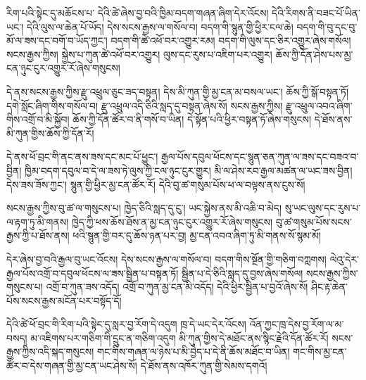 \documentclass[12pt]{nextbook}
\begin{document}
\begin{readersection}{རིག་པའི་སྟེང་དུ་མཆོངས་པ་}
དེའི་ཚེ་ཞེས་བྱ་བའི་ཁྱིམ་བདག་གཞན་ཞིག་དེར་འོངས། དེའི་རིགས་ནི་བཟང་པོ་ཡིན་ཡང་། དེའི་ལུས་ལ་ཆེན་པོ་ཡོད། དེས་སངས་རྒྱས་ལ་གསོལ་བ། བདག་གི་སྙུན་གྱི་ཕྱིར་ངལ་ཆེ། བདག་གི་བུ་དང་བུ་མོ་ལ་ཟས་དང་བགོ་བ་ཡོད་ཀྱང་། བདག་གི་ཚེ་འཕོ་བར་འགྱུར་རམ། བདག་གི་ལུས་དང་ཅིར་འགྱུར་ཞེས་གསོལ། སངས་རྒྱས་ཀྱིས། སྐྱེས་པ་ཀུན་ཚེ་འཕོ་བར་འགྱུར། ལུས་དང་རུས་པ་འཇིག་པར་འགྱུར། ཆོས་ཀྱི་དོན་ཤེས་པས་མྱ་ངན་ཉུང་ངུར་འགྱུར་རོ་ཞེས་གསུངས།

དེ་ནས་སངས་རྒྱས་ཀྱིས་རྫུ་འཕྲུལ་ཅུང་ཟད་བསྟན། དེས་མི་ཀུན་གྱི་མྱ་ངན་མ་བསལ་ཡང་། ཆོས་ཀྱི་སྒོ་བསྟན་ཏོ། དགེ་སློང་ཞིག་གིས་གསོལ་བ། རྫུ་འཕྲུལ་འདི་ཅིའི་སླད་དུ་བསྟན་ཞེས་སོ། སངས་རྒྱས་ཀྱིས། རྫུ་འཕྲུལ་འབའ་ཞིག་གིས་འགྲོ་བ་མི་སྐྱོབ། ཆོས་ཀྱི་དོན་ཚོར་བ་ནི་གསོ་བ་ཡིན། དེ་སྟོན་པའི་ཕྱིར་བསྟན་ཏོ་ཞེས་གསུངས། དེ་ཐོས་ནས་མི་ཀུན་གྱིས་ཆོས་ཀྱི་དོན་རོ།

དེ་ནས་ཕོ་བྲང་གི་ནང་ནས་ཟས་དང་མང་པོ་ཕྱུང་། རྒྱལ་པོས་དབུལ་ཕོངས་དང་སྙུན་ཅན་ཀུན་ལ་ཟས་དང་བཟའ་བ་བྱིན། ཁྱིམ་བདག་དབུལ་བ་དེ་ལ་ཟས་ཏེ་ལུས་ཀྱི་ངལ་ཉུང་ངུར་གྱུར། མི་ལ་ཤེས་རབ་རྒྱལ་མཚན་ལ་ཡང་ཟས་བྱིན། དེས་ཟས་ཟོས་ཀྱང་། སྙུན་གྱི་ཕྱིར་མྱ་ངན་ཚོར་རོ། དེའི་བུ་ཚ་གསུམ་པོས་ཕ་ལ་བལྟས་ནས་ངུས་སོ།

སངས་རྒྱས་ཀྱིས་བུ་ཚ་ལ་གསུངས་པ། ཁྱེད་ཅིའི་སླད་དུ་ངུ་། ཡང་སྐྱེས་ནས་མི་འཆི་བ་མེད། སུ་ཡང་ལུས་དང་རུས་པ་ལ་རྟག་ཏུ་མི་གནས། ཁྱེད་ཀྱི་ཕས་ཆོས་ཐོས་ན་མྱ་ངན་ཉུང་ངུར་འགྱུར་རོ་ཞེས་གསུངས། བུ་ཚ་གསུམ་པོས་སངས་རྒྱས་ཀྱི་པ་ཐོས་ནས། ཕའི་སྙུན་གྱི་བར་དུ་ཆོས་ཉན་པར་བྱ། མྱ་ངན་འབའ་ཞིག་ཏུ་མི་གནས་སོ་སྙམ་མོ།

དེར་ཞེས་བྱ་བའི་རྒྱལ་བུ་ཡང་འོངས། དེས་སངས་རྒྱས་ལ་གསོལ་བ། བདག་གིས་སྔོན་གྱི་གཅིག་བཀླགས། ལེའུ་དེར་རྒྱལ་པོས་འགྲོ་བ་དབུལ་ཕོངས་ལ་ཟས་སྦྱིན་པ་བསྟན་ཏོ། སྦྱིན་པ་དེ་ཅིའི་སླད་དུ་བྱས་ཞེས་གསོལ། སངས་རྒྱས་ཀྱིས་གསུངས་པ། འགྲོ་བ་ཀུན་ཟས་འདོད། འགྲོ་བ་ཀུན་མྱ་ངན་མི་འདོད། དེའི་ཕྱིར་སྦྱིན་པ་བྱའོ་ཞེས་སོ། ཤིང་རྟ་ཆེན་པོས་སངས་རྒྱས་མངོན་པར་བསྟོད་དོ།

དེའི་ཚེ་ཕོ་བྲང་གི་རིག་པའི་སྟེང་དུ་སླར་བྱ་རོག་དེ་འདུག ཁྲ་དེ་ཡང་དེར་འོངས། འོན་ཀྱང་ཁྲ་དེས་བྱ་རོག་ལ་མ་བསད། མ་འཇིགས་པར་གཅིག་གི་དྲུང་ན་གཅིག་འདུག མི་ཀུན་གྱིས་དེ་མཐོང་ནས་སྙིང་རྗེའི་དོན་ཚོར་རོ། སངས་རྒྱས་ཀྱིས་འདི་སྐད་གསུངས། གང་གིས་གཞན་ལ་ཉེས་པ་མི་བྱེད་པ་དེ་ནི་ཆོས་མཐོང་བ་ཡིན། གང་གིས་མྱ་ངན་ཚོར་བ་དེས་གཞན་གྱི་མྱ་ངན་ཡང་ཤེས་སོ། དེ་ཐོས་ནས་འཁོར་ཀུན་གྱི་སེམས་དགའོ།
\end{readersection}
\end{document}
